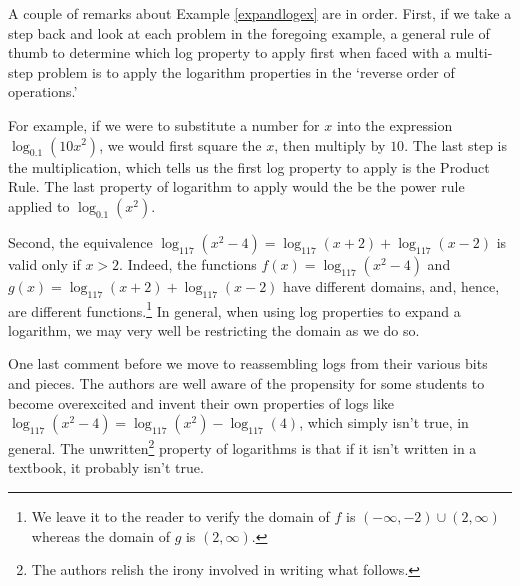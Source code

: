 \documentclass{ximera}
\begin{document}
A couple of remarks about Example \ref{expandlogex} are in order.  First, if we take a step back and look at each problem in the foregoing example, a general rule of thumb to determine which log property to apply first when faced with a multi-step problem is to apply the logarithm properties in the  `reverse order of operations.'

\smallskip

For example, if we were to substitute a number for $x$ into the expression $\log_{0.1} \left(10 x^2 \right)$, we would first square the $x$, then multiply by $10$.  The last step is the multiplication, which tells us the first log property to apply is the Product Rule.  The last property of logarithm to apply would the be the power rule applied to $\log_{0.1}(x^2)$.

\smallskip

Second,  the equivalence $\log_{117}\left(x^2-4\right) = \log_{117}(x+2) + \log_{117}(x-2)$ is valid only if $x > 2$.  Indeed,  the functions $f(x) = \log_{117}\left(x^2-4\right)$ and $g(x) = \log_{117}(x+2) + \log_{117}(x-2)$ have different domains, and, hence, are different functions.\footnote{We leave it to the reader to verify the domain of $f$ is $(-\infty, -2) \cup (2,\infty)$ whereas the domain of $g$ is $(2,\infty)$.} In general, when using log properties to expand a logarithm, we may very well be restricting the domain as we do so. 

\smallskip

One last comment before we move to reassembling logs from their various bits and pieces. The authors are well aware of the propensity for some students to become overexcited and invent their own properties of logs like $\log_{117}\left(x^2-4\right) = \log_{117}\left(x^2\right) - \log_{117}(4)$, which simply isn't true, in general.  The unwritten\footnote{The authors relish the irony involved in writing what follows.} property of logarithms is that if it isn't written in a textbook, it probably isn't true.    
\end{document}
